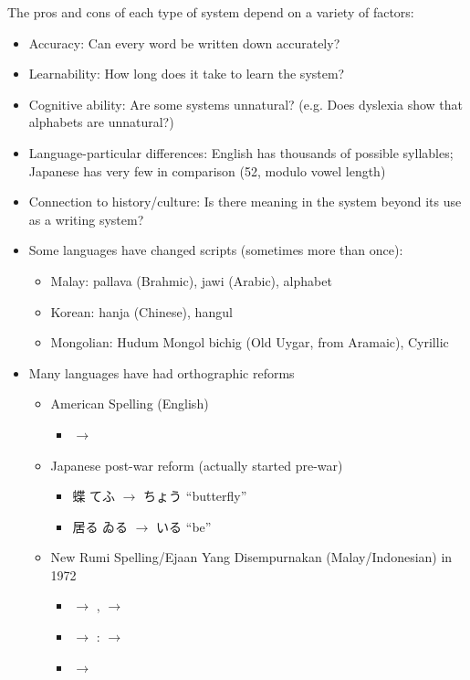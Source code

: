 \documentclass[a4paper,landscape,headrule,footrule,xetex]{foils}
\begin{document}
The pros and cons of each type of system depend on a variety of factors: 
\begin{itemize}
\item Accuracy:  Can every word be written down accurately?
\item Learnability: How long does it take to learn the system?
\item Cognitive ability: Are some systems unnatural? (e.g. Does dyslexia show that alphabets are unnatural?)
\item Language-particular differences: English has thousands of
  possible syllables; Japanese has very few in comparison (52, modulo
  vowel length)
\item Connection to history/culture: Is there meaning in the system
  beyond its use as a writing system?
  \newpage
\item Some languages have changed scripts (sometimes more than once):
  \begin{itemize}
  \item  Malay: pallava (Brahmic),  jawi (Arabic), alphabet
  \item  Korean: hanja (Chinese), hangul
  \item Mongolian: Hudum Mongol bichig (Old Uygar, from Aramaic), Cyrillic
  \end{itemize}
\item Many languages have had orthographic reforms
  \begin{itemize}
  \item American Spelling (English)
    \begin{itemize}
    \item {} $\rightarrow$ 
    \end{itemize}
  \item Japanese post-war reform (actually started pre-war)
    \begin{itemize}
    \item  蝶   てふ  $\rightarrow$  ちょう
       ``butterfly''
    \item  居る ゐる  $\rightarrow$  いる  ``be''
  \end{itemize}

\item New Rumi Spelling/Ejaan Yang Disempurnakan (Malay/Indonesian) in 1972
  \begin{itemize}
  \item {} $\rightarrow$ 	,  $\rightarrow$ 
  \item {}  $\rightarrow$ :   $\rightarrow$
  \item   {}	 $\rightarrow$ 
  \end{itemize}
\end{itemize}
\end{itemize}
\end{document}
